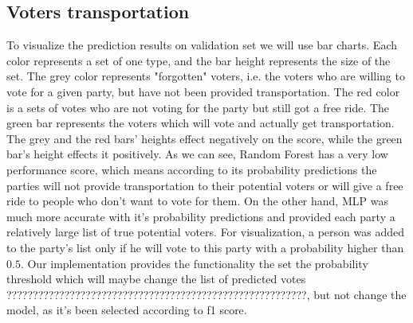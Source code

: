 \documentclass[12pt]{article}
\begin{document}
\subsection{Voters transportation}
To visualize the prediction results on validation set we will use bar charts. Each color represents a set of one type, and the bar height represents the size of the set. The grey color represents "forgotten" voters, i.e. the voters who are willing to vote for a given party, but have not been provided transportation. The red color is a sets of votes who are not voting for the party but still got a free ride. The green bar represents the voters which will vote and actually get transportation. The grey and the red bars' heights effect negatively on the score, while the green bar's height effects it positively. As we can see, Random Forest has a very low performance score, which means according to its probability predictions the parties will not provide transportation to their potential voters or will give a free ride to people who don't want to vote for them. On the other hand, MLP was much more accurate with it's probability predictions and provided each party a relatively large list of true potential voters. For visualization, a person was added to the party's list only if he will vote to this party with a probability higher than $0.5$. Our implementation provides the functionality the set the probability threshold which will maybe change the list of predicted votes ?????????????????????????????????????????????????????????, but not change the model, as it's been selected according to f1 score. 
\end{document}
